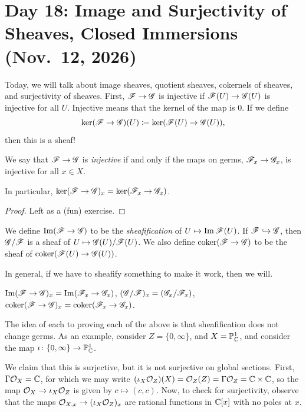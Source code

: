\section{Day 18: Image and Surjectivity of  Sheaves, Closed Immersions (Nov.\ 12, 2026)}
Today, we will talk about image sheaves, quotient sheaves, cokernels of sheaves, and surjectivity of sheaves. First, $\mathscr F \to \mathscr G$ is injective if $\mathscr F(U) \to \mathscr G(U)$ is injective for all $U$. Injective means that the kernel of the map is $0$. If we define
\[ \ker(\mathscr F \to \mathscr G)(U) \coloneq \ker(\mathscr F(U) \to \mathscr G(U)), \]
then this is a sheaf!

\begin{theorem} \label{thm:localization_sheaf_injectivity}
    We say that $\mathscr F \to \mathscr G$ is \textit{injective} if and only if the maps on germs, $\mathscr F_x \to \mathscr G_x$, is injective for all $x \in X$.
\end{theorem}
In particular, $\ker(\mathscr F \to \mathscr G)_x = \ker(\mathscr F_x \to \mathscr G_x)$.
\begin{proof}
    Left as a {\color{amethyst}(fun)} exercise.
\end{proof}

We define $\operatorname{Im}(\mathscr F \to \mathscr G)$ to be the \textit{sheafification} of $U \mapsto \operatorname{Im} \mathscr F(U)$. If $\mathscr F \hookrightarrow \mathscr G$, then $\mathscr G / \mathscr F$ is a sheaf of $U \mapsto \mathscr G(U)/\mathscr F(U)$. We also define $\operatorname{coker}(\mathscr F \to \mathscr G)$ to be the sheaf of $\operatorname{coker}(\mathscr F(U) \to \mathscr G(U))$.

In general, if we have to sheafify something to make it work, then we will.

\begin{theorem} \label{thm:localization_sheaf_image_quotient_cokernel}
    $\operatorname{Im}(\mathscr F \to \mathscr G)_x = \operatorname{Im}(\mathscr F_x \to \mathscr G_x)$, $(\mathscr G/\mathscr F)_x = (\mathscr G_x/\mathscr F_x)$, $\operatorname{coker}(\mathscr F \to \mathscr G)_x = \operatorname{coker}(\mathscr F_x \to \mathscr G_x)$.
\end{theorem}
The idea of each to proving each of the above is that sheafification does not change germs. As an example, consider $Z = \{0, \infty\}$, and $X = \mathbb P_\mathbb C^1$, and consider the map $\iota \colon \{0, \infty\} \to \mathbb P_\mathbb C^1$.

We claim that this is surjective, but it is not surjective on global sections. First, $\Gamma \mathcal O_X = \mathbb C$, for which we may write $(\iota_X \mathcal O_Z)(X) = \mathcal O_Z(Z) = \Gamma \mathcal O_Z = \mathbb C \times \mathbb C$, so the map $\mathcal O_X \to \iota_X \mathcal O_Z$ is given by $c \mapsto (c, c)$. Now, to check for surjectivity, observe that the maps $\mathcal O_{X, x} \to (\iota_X \mathcal O_Z)_x$ are rational functions in $\mathbb C[x]$ with no poles at $x$.

